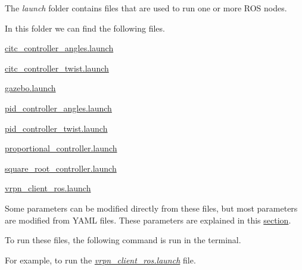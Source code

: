 The {\itshape launch} folder contains files that are used to run one or more ROS nodes.

In this folder we can find the following files.


\begin{DoxyItemize}
\item \mbox{\hyperlink{citc__controller__angles_8launch}{citc\+\_\+controller\+\_\+angles.\+launch}}
\item \mbox{\hyperlink{citc__controller__twist_8launch}{citc\+\_\+controller\+\_\+twist.\+launch}}
\item \mbox{\hyperlink{gazebo_8launch}{gazebo.\+launch}}
\item \mbox{\hyperlink{pid__controller__angles_8launch}{pid\+\_\+controller\+\_\+angles.\+launch}}
\item \mbox{\hyperlink{pid__controller__twist_8launch}{pid\+\_\+controller\+\_\+twist.\+launch}}
\item \mbox{\hyperlink{proportional__controller_8launch}{proportional\+\_\+controller.\+launch}}
\item \mbox{\hyperlink{square__root__controller_8launch}{square\+\_\+root\+\_\+controller.\+launch}}
\item \mbox{\hyperlink{vrpn__client__ros_8launch}{vrpn\+\_\+client\+\_\+ros.\+launch}}
\end{DoxyItemize}

Some parameters can be modified directly from these files, but most parameters are modified from YAML files. These parameters are explained in this \mbox{\hyperlink{yaml_files}{section}}.

To run these files, the following command is run in the terminal.


\begin{DoxyCode}{0}

\end{DoxyCode}


For example, to run the {\itshape \mbox{\hyperlink{vrpn__client__ros_8launch}{vrpn\+\_\+client\+\_\+ros.\+launch}}} file. 
\begin{DoxyCode}{0}

\end{DoxyCode}
 